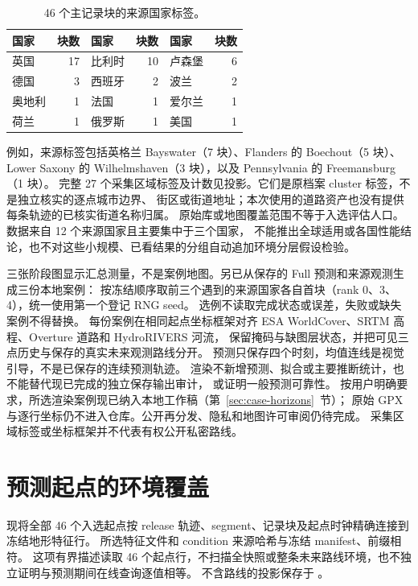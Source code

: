 \begin{table}[htbp]
\centering\small
\caption{46 个主记录块的来源国家标签。}
\label{tab:geographic-blocks}\hypertarget{tab:geographic-blocks}{}
\begin{tabular}{lr lr lr}
\toprule
国家 & 块数 & 国家 & 块数 & 国家 & 块数\\
\midrule
英国 & 17 & 比利时 & 10 & 卢森堡 & 6\\
德国 & 3 & 西班牙 & 2 & 波兰 & 2\\
奥地利 & 1 & 法国 & 1 & 爱尔兰 & 1\\
荷兰 & 1 & 俄罗斯 & 1 & 美国 & 1\\
\bottomrule
\end{tabular}
\end{table}

例如，来源标签包括英格兰 Bayswater（7 块）、Flanders 的 Boechout（5 块）、
Lower Saxony 的 Wilhelmshaven（3 块），以及 Pennsylvania 的 Freemansburg（1 块）。
完整 27 个采集区域标签及计数见投影。它们是原档案 cluster 标签，不是独立核实的逐点城市边界、
街区或街道地址；本次使用的道路资产也没有提供每条轨迹的已核实街道名称归属。
原始库或地图覆盖范围不等于入选评估人口。数据来自 12 个来源国家且主要集中于三个国家，
不能推出全球适用或各国性能结论，也不对这些小规模、已看结果的分组自动追加环境分层假设检验。

三张阶段图显示汇总测量，不是案例地图。另已从保存的 Full 预测和来源观测生成三份本地案例：
按冻结顺序取前三个遇到的来源国家各自首块（rank 0、3、4），统一使用第一个登记 RNG seed。
选例不读取完成状态或误差，失败或缺失案例不得替换。
每份案例在相同起点坐标框架对齐 ESA WorldCover、SRTM 高程、Overture 道路和 HydroRIVERS 河流，
保留掩码与缺图层状态，并把可见三点历史与保存的真实未来观测路线分开。
预测只保存四个时刻，均值连线是视觉引导，不是已保存的连续预测轨迹。
渲染不新增预测、拟合或主要推断统计，也不能替代现已完成的独立保存输出审计，
或证明一般预测可靠性。
按用户明确要求，所选渲染案例现已纳入本地工作稿（第~\ref{sec:case-horizons}~节）；
原始 GPX 与逐行坐标仍不进入仓库。公开再分发、隐私和地图许可审阅仍待完成。
采集区域标签或坐标框架并不代表有权公开私密路线。


\section{预测起点的环境覆盖}
\label{sec:origin-environment}\hypertarget{sec:origin-environment}{}
现将全部 46 个入选起点按 release 轨迹、segment、记录块及起点时钟精确连接到冻结地形特征行。
所选特征文件和 condition 来源哈希与冻结 manifest、前缀相符。
这项有界描述读取 46 个起点行，不扫描全快照或整条未来路线环境，也不独立证明与预测期间在线查询逐值相等。
不含路线的投影保存于 。

